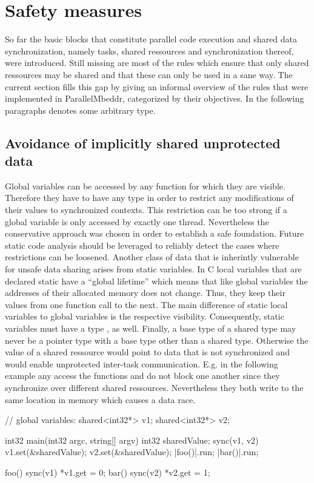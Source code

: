 \section{Safety measures}
So far the basic blocks that constitute parallel code execution and shared data synchronization, namely tasks, shared ressources and synchronization thereof, were introduced. Still missing are most of the rules which ensure that only shared ressources may be shared and that these can only be used in a sane way. The current section fills this gap by giving an informal overview of the rules that were implemented in ParallelMbeddr, categorized by their objectives. In the following paragraphs  denotes some arbitrary type.

\subsection{Avoidance of implicitly shared unprotected data}
Global variables can be accessed by any function for which they are visible. Therefore they have to have any type  in order to restrict any modifications of their values to synchronized contexts. This restriction can be too strong if a global variable is only accessed by exactly one thread. Nevertheless the conservative approach was chosen in order to establish a safe foundation. Future static code analysis should be leveraged to reliably detect the cases where restrictions can be loosened.
Another class of data that is inherintly vulnerable for unsafe data sharing arises from static variables. In C local variables that are declared static have a ``global lifetime''\cite[p.~439]{ProgrammingInC} which means that like global variables the addresses of their allocated memory does not change. Thus, they keep their values from one function call to the next. The main difference of static local variables to global variables is the respective visibility. Consequently, static variables must have a type , as well.
Finally, a base type  of a shared type may never be a pointer type with a base type other than a shared type. Otherwise the value of a shared ressource would point to data that is not synchronized and would enable unprotected inter-task communication. E.g. in the following example any access the functions  and  do not block one another since they synchronize over different shared ressources. Nevertheless they both write to the same location in memory which causes a data race.
\begin{ccode}
// global variables:
shared<int32*> v1;
shared<int32*> v2;

int32 main(int32 argc, string[] argv) {
  int32 sharedValue;
  sync(v1, v2) {
    v1.set(&sharedValue);
    v2.set(&sharedValue);
  }
  |foo()|.run;
  |bar()|.run;
}

foo() {
  sync(v1) { *v1.get = 0; }
}
bar() {
  sync(v2) { *v2.get = 1; }
}
\end{ccode}

